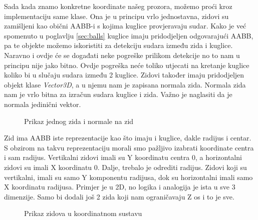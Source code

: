 Sada kada znamo konkretne koordinate našeg prozora, možemo proći kroz implementaciju same klase. Ona je u principu vrlo jednostavna, zidovi su zamišljeni kao obični AABB-i s kojima kuglice provjeravaju sudar. Kako je već spomenuto u poglavlju \ref{sec:balls} kuglice imaju pridodjeljen odgovarajući AABB, pa te objekte možemo iskoristiti za detekciju sudara između zida i kuglice. Naravno i ovdje će se događati neke pogreške prilikom detekcije no to nam u principu nije jako bitno. Ovdje pogreška neće toliko utjecati na kretanje kuglice koliko bi u slučaju sudara između 2 kuglice. Zidovi također imaju pridodjeljen objekt klase \emph{Vector3D}, a u njemu nam je zapisana normala zida. Normala zida nam je vrlo bitna za izračun sudara kuglice i zida. Važno je naglasiti da je normala jedinični vektor.

\begin{figure}[!http]
	\begin{center}
	\end{center}
	\caption {Prikaz jednog zida i normale na zid}
	\label{fig:19}
\end{figure}
Zid ima AABB iste reprezentacije kao što imaju i kuglice, dakle radijus i centar. S obzirom na takvu reprezentaciju morali smo pažljivo izabrati koordinate centra i sam radijus. Vertikalni zidovi imali su Y koordinatu centra 0, a horizontalni zidovi su imali X koordinatu 0. Dalje, trebalo je odrediti radijus. Zidovi koji su vertikalni, imali su samo Y komponentu radijusa, dok su horizontalni imali samo X koordinatu radijusa. Primjer je u 2D, no logika i analogija je ista u sve 3 dimenzije. Samo bi dodali još 2 zida koji nam ograničavaju Z os i to je sve.
\begin{figure}[!http]
	\begin{center}
	\end{center}
	\caption {Prikaz zidova u koordinatnom sustavu}
	\label{fig:20}
\end{figure}

